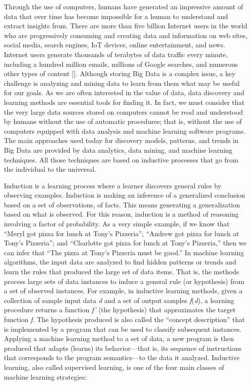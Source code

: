 Through the use of computers, humans have generated an impressive amount of data that over time has become impossible for a human to understand and extract insights from. There are more than five billion Internet users in the world who are progressively consuming and creating data and information on web sites, social media, search engines, IoT devices, online entertainment, and news. Internet users generate thousands of terabytes of data traffic every minute, including a hundred million emails, millions of Google searches, and numerous other types of content [\citealt{chap:4:ChauhanandSood:2021}]. Although storing Big Data is a complex issue, a key challenge is analyzing and mining data to learn from them what may be useful for our goals. As we are often interested in the value of data, data discovery and learning methods are essential tools for finding it. In fact, we must consider that the very large data sources stored on computers cannot be read and understood by humans without the use of automatic procedures; that is, without the use of computers equipped with data analysis and machine learning software programs. The main approaches used today for discovery models, patterns, and trends in Big Data are provided by data analytics, data mining, and machine learning techniques. All those techniques are based on inductive processes that go from the individual to the universal.

Induction is a learning process where a learner discovers general rules by observing examples. Induction is making an inference of a generalized conclusion based on a set of observations, of facts. This means generating a generalization based on what is observed. For this reason, induction is a method of reasoning involving a factor of probability. As a very simple example, if we know that ``Meryl got pizza for lunch at Tony's Pizzeria''; ``Andrew got pizza for lunch at Tony's \hbox{Pizzeria'';} and ``Charlotte got pizza for lunch at Tony's Pizzeria,'' then we can infer that ``The pizza at Tony's Pizzeria must be good.'' In machine learning algorithms, the input data are analyzed to find hidden patterns or trends and learn the rules that produced the large set of data items. That is, the methods process large sets of data instances to induce a general rule (or hypothesis) from a set of observed instances. For example, in inductive learning methods, given a collection of sample input data \textit{d} and a set of output samples \textit{f}(\textit{d}), a learning procedure returns a function \textit{f'} (the hypothesis) that approximates the target function \textit{f}. The hypothesis produced is also called the ``concept description'' that is implemented by a program that can be used to classify subsequent instances. Applying a machine learning method to a set of data, a new program is then produced that adapts (learns) its behavior---that is, its sequence of instructions that corresponds to the program semantics---to the data it analyzed. Inductive learning, also called supervised learning, is one of the four main classes of machine learning strategies:

